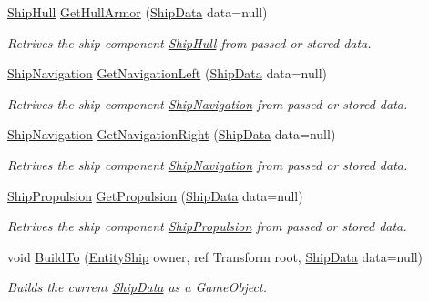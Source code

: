 \begin{DoxyCompactItemize}
\hyperlink{class_skyrates_1_1_ship_1_1_ship_hull}{Ship\-Hull} \hyperlink{class_skyrates_1_1_ship_1_1_ship_rig_a3d5b3a6cc2d08e62d6e457c5f174e0ac}{Get\-Hull\-Armor} (\hyperlink{class_skyrates_1_1_ship_1_1_ship_data}{Ship\-Data} data=null)
\begin{DoxyCompactList}\small\item\em Retrives the ship component \hyperlink{class_skyrates_1_1_ship_1_1_ship_hull}{Ship\-Hull} from passed or stored data. \end{DoxyCompactList}\item 
\hyperlink{class_skyrates_1_1_ship_1_1_ship_navigation}{Ship\-Navigation} \hyperlink{class_skyrates_1_1_ship_1_1_ship_rig_a83a640eb012e7036e0cb865805a2479d}{Get\-Navigation\-Left} (\hyperlink{class_skyrates_1_1_ship_1_1_ship_data}{Ship\-Data} data=null)
\begin{DoxyCompactList}\small\item\em Retrives the ship component \hyperlink{class_skyrates_1_1_ship_1_1_ship_navigation}{Ship\-Navigation} from passed or stored data. \end{DoxyCompactList}\item 
\hyperlink{class_skyrates_1_1_ship_1_1_ship_navigation}{Ship\-Navigation} \hyperlink{class_skyrates_1_1_ship_1_1_ship_rig_a0e610bfb1f602b5961a1c7f9da83f2ad}{Get\-Navigation\-Right} (\hyperlink{class_skyrates_1_1_ship_1_1_ship_data}{Ship\-Data} data=null)
\begin{DoxyCompactList}\small\item\em Retrives the ship component \hyperlink{class_skyrates_1_1_ship_1_1_ship_navigation}{Ship\-Navigation} from passed or stored data. \end{DoxyCompactList}\item 
\hyperlink{class_skyrates_1_1_ship_1_1_ship_propulsion}{Ship\-Propulsion} \hyperlink{class_skyrates_1_1_ship_1_1_ship_rig_adf18b18ffa742bc18d8bf2036fb5185e}{Get\-Propulsion} (\hyperlink{class_skyrates_1_1_ship_1_1_ship_data}{Ship\-Data} data=null)
\begin{DoxyCompactList}\small\item\em Retrives the ship component \hyperlink{class_skyrates_1_1_ship_1_1_ship_propulsion}{Ship\-Propulsion} from passed or stored data. \end{DoxyCompactList}\item 
void \hyperlink{class_skyrates_1_1_ship_1_1_ship_rig_a4b95c83af267ac56332d99ef03b08d86}{Build\-To} (\hyperlink{class_skyrates_1_1_entity_1_1_entity_ship}{Entity\-Ship} owner, ref Transform root, \hyperlink{class_skyrates_1_1_ship_1_1_ship_data}{Ship\-Data} data=null)
\begin{DoxyCompactList}\small\item\em Builds the current \hyperlink{class_skyrates_1_1_ship_1_1_ship_data}{Ship\-Data} as a Game\-Object. \end{DoxyCompactList}\end{DoxyCompactItemize}
